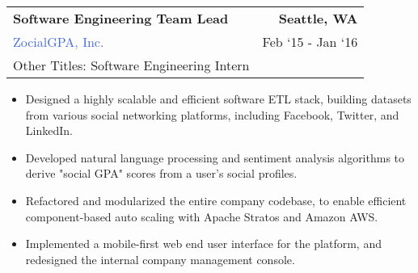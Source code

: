 \documentclass[10pt]{article}
\newcommand{\highlightcolor}{RoyalBlue}
\newcommand{\tabularxwidth}{\textwidth}
\begin{document}
    \begin{minipage}{\tabularxwidth}

        \begin{tabularx}{\tabularxwidth}{X r}
            \textbf{Software Engineering Team Lead} & \textbf{Seattle, 
        WA} \\
            
    
    
    

    
        \textcolor{\highlightcolor}{ZocialGPA, Inc.} & 
        
    Feb ‘15 - 
    Jan ‘16 \\
        
    
            
                Other Titles: Software Engineering Intern & \\
            
        \end{tabularx}

        \begin{itemize}[noitemsep, topsep=3pt, parsep=0pt, partopsep=0pt]
            
                \item 
    Designed a highly scalable and efficient software ETL stack, building datasets from various social networking platforms, including Facebook, Twitter, and LinkedIn.
            
                \item 
    Developed natural language processing and sentiment analysis algorithms to derive "social GPA" scores from a user's social profiles.
            
                \item 
    Refactored and modularized the entire company codebase, to enable efficient component-based auto scaling with Apache Stratos and Amazon AWS.
            
                \item 
    Implemented a mobile-first web end user interface for the platform, and redesigned the internal company management console.
            
        \end{itemize}

        
            \vspace{.5em}
        

    \end{minipage}
    
\end{document}
